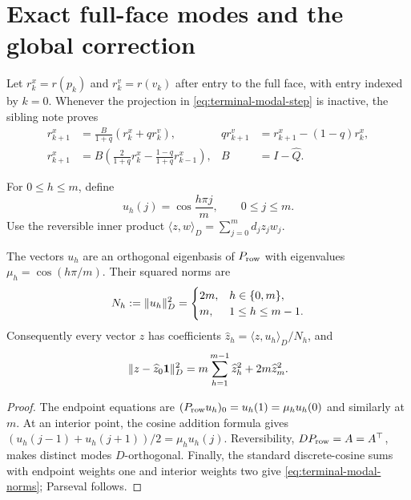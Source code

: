 \section{Exact full-face modes and the global correction}
\label{sec:terminal-modal-exact}

Let $r_k^x=r(p_k)$ and $r_k^v=r(v_k)$ after entry to the full face, with entry
indexed by $k=0$.  Whenever the projection in
\cref{eq:terminal-modal-step} is inactive, the sibling note proves
\begin{align}
 r_{k+1}^x&=\frac{B}{1+q}(r_k^x+q r_k^v),
 &q r_{k+1}^v&=r_{k+1}^x-(1-q)r_k^x,
 \label{eq:terminal-modal-two-state}\\
 r_{k+1}^x&=B\left(\frac2{1+q}r_k^x
 -\frac{1-q}{1+q}r_{k-1}^x\right),
 &B&=I-\widehat Q.
 \label{eq:terminal-modal-second-order}
\end{align}

For $0\le h\le m$, define
\begin{equation}
 u_h(j)=\cos\frac{h\pi j}{m},\qquad 0\le j\le m.
 \label{eq:terminal-modal-cosines}
\end{equation}
Use the reversible inner product
$\langle z,w\rangle_D=\sum_{j=0}^m d_jz_jw_j$.

\begin{lemma}
\label{lem:terminal-modal-cosines}
The vectors $u_h$ are an orthogonal eigenbasis of $P_{\rm row}$ with
eigenvalues $\mu_h=\cos(h\pi/m)$.  Their squared norms are
\begin{equation}
 N_h:=\lVert u_h\rVert_{D}^{2}
 =\begin{cases}
 2m,&h\in\{0,m\},\\
 m,&1\le h\le m-1.
 \end{cases}
 \label{eq:terminal-modal-norms}
\end{equation}
Consequently every vector $z$ has coefficients
$\widehat z_h=\langle z,u_h\rangle_D/N_h$, and
\begin{equation}
 \lVert z-\widehat z_0\mathbf{1}\rVert_D^2
 =m\sum_{h=1}^{m-1}\widehat z_h^2+2m\widehat z_m^2.
 \label{eq:terminal-modal-parseval}
\end{equation}
\end{lemma}

\begin{proof}
The endpoint equations are
$(P_{\rm row}u_h)_0=u_h(1)=\mu_hu_h(0)$ and similarly at $m$.
At an interior point, the cosine addition formula gives
$(u_h(j-1)+u_h(j+1))/2=\mu_hu_h(j)$.  Reversibility,
$DP_{\rm row}=A=A^\top$, makes distinct modes $D$-orthogonal.  Finally,
the standard discrete-cosine sums with endpoint weights one and interior
weights two give \eqref{eq:terminal-modal-norms}; Parseval follows.
\end{proof}

